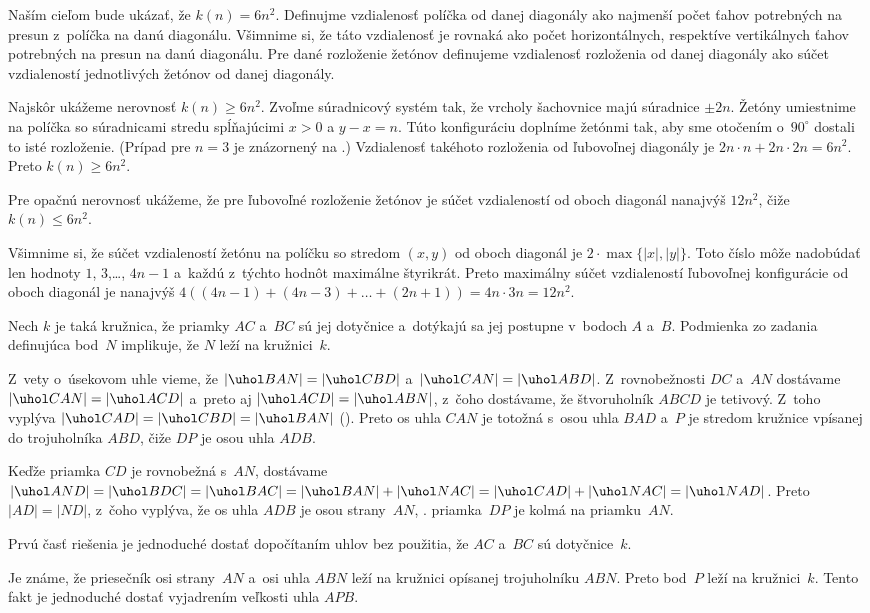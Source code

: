 {%
Naším cieľom bude ukázať, že $k(n) = 6n^2$. Definujme vzdialenosť políčka od danej diagonály ako najmenší počet ťahov potrebných na presun z~políčka na danú diagonálu. Všimnime si, že táto vzdialenosť je rovnaká ako počet horizontálnych, respektíve vertikálnych ťahov potrebných na presun na danú diagonálu. Pre dané rozloženie žetónov definujeme vzdialenosť rozloženia od danej diagonály ako súčet vzdialeností jednotlivých žetónov od danej diagonály.

Najskôr ukážeme nerovnosť $k(n)\ge 6n^2$. Zvoľme súradnicový systém tak, že vrcholy šachovnice majú súradnice $\pm 2n$. Žetóny umiestnime na políčka so súradnicami stredu spĺňajúcimi $x>0$ a $y-x = n$. Túto konfiguráciu doplníme žetónmi tak, aby sme otočením o~$90^\circ$ dostali to isté rozloženie. (Prípad pre $n=3$ je znázornený na \obr{}.) Vzdialenosť takéhoto rozloženia od ľubovoľnej diagonály je $2n \cdot n + 2n \cdot 2n = 6n^2$. Preto $k(n)\ge 6n^2$.
%

Pre opačnú nerovnosť ukážeme, že pre ľubovoľné rozloženie žetónov je súčet vzdialeností od oboch diagonál nanajvýš $12n^2$, čiže $k(n)\le 6n^2$.

Všimnime si, že súčet vzdialeností žetónu na políčku so stredom $(x,y)$ od oboch diagonál je $2\cdot\max\{|x|,|y|\}$. Toto číslo môže nadobúdať len hodnoty $1$, $3$,\dots, ${4n-1}$ a~každú z~týchto hodnôt maximálne štyrikrát. Preto maximálny súčet vzdialeností ľubovoľnej konfigurácie od oboch diagonál je nanajvýš $4((4n-1) + (4n-3) + \dots + (2n + 1)) = 4n \cdot 3n = 12n^2$.
}

{%
Nech $k$ je taká kružnica, že priamky $AC$ a~$BC$ sú jej dotyčnice a~dotýkajú sa jej postupne v~bodoch $A$ a~$B$. Podmienka zo zadania definujúca bod~$N$ implikuje, že $N$ leží na kružnici~$k$.
%

Z~vety o~úsekovom uhle vieme, že $|\uhol BAN| = |\uhol CBD|$ a~$|\uhol CAN| = |\uhol ABD|$. Z~rovnobežnosti $DC$ a~$AN$ dostávame $|\uhol CAN|= |\uhol ACD|$ a~preto aj $|\uhol ACD|= |\uhol ABN|$, z~čoho dostávame, že štvoruholník $ABCD$ je tetivový. Z~toho vyplýva $|\uhol CAD|= |\uhol CBD| = |\uhol BAN|$ (\obr). Preto os uhla $CAN$ je totožná s~osou uhla $BAD$ a~$P$ je stredom kružnice vpísanej do trojuholníka $ABD$, čiže $DP$ je osou uhla $ADB$.

Keďže priamka $CD$ je rovnobežná s~$AN$, dostávame $|\uhol AND|=  |\uhol BDC| = |\uhol BAC| = |\uhol BAN| + |\uhol NAC| = |\uhol CAD| + |\uhol NAC| = |\uhol NAD|$. Preto $|AD|=|ND|$, z~čoho vyplýva, že os uhla $ADB$ je osou strany~$AN$, \tj. priamka~$DP$ je kolmá na priamku~$AN$.

\poznamky
Prvú časť riešenia je jednoduché dostať dopočítaním uhlov bez použitia, že $AC$ a~$BC$ sú dotyčnice~$k$.

Je známe, že priesečník osi strany~$AN$ a~osi uhla $ABN$ leží na kružnici opísanej trojuholníku $ABN$. Preto bod~$P$ leží na kružnici~$k$. Tento fakt je jednoduché dostať vyjadrením veľkosti uhla $APB$.
}

